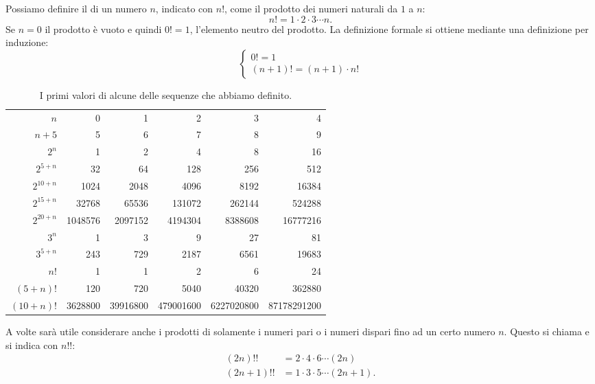 \begin{definition}[fattoriale]
Possiamo definire il  di un numero $n$, indicato con $n!$, come il prodotto
dei numeri naturali da $1$ a $n$:
\[
  n!  = 1 \cdot 2 \cdot 3 \cdots n.
\]
Se $n=0$ il prodotto è vuoto e quindi $0!=1$, l'elemento neutro del prodotto.
La definizione formale si ottiene mediante una definizione per induzione:
\[
  \begin{cases}
    0! = 1 \\
    (n+1)! = (n+1) \cdot n!
  \end{cases}
\]

\begin{table}
\begin{center}
\begin{tabular}{r|>{\small}r>{\small}r>{\small}r>{\small}r>{\small}r}
$n$       & 0 & 1 & 2 & 3 & 4 \\
\footnotesize $n+5$     & 5 & 6 & 7 & 8 & 9 \\ \hline
$2^n$     & 1 & 2 & 4 & 8 & 16 \\
\footnotesize $2^{5+n}$ & 32 & 64 & 128 & 256 & 512 \\
\footnotesize $2^{10+n}$ & 1024 & 2048 & 4096 & 8192 & 16384 \\
\footnotesize $2^{15+n}$ & 32768 & 65536 & 131072 & 262144 & 524288 \\
\footnotesize $2^{20+n}$ & 1048576 & 2097152 & 4194304 & 8388608 & 16777216 \\  \hline
$3^n$                    & 1 & 3 & 9 & 27 & 81 \\
\footnotesize $3^{5+n}$  & 243 & 729 & 2187 & 6561 & 19683 \\  \hline
$n!$      & 1 & 1 & 2 & 6 & 24 \\
\footnotesize $(5+n)!$  & 120 & 720 & 5040 & 40320 & 362880 \\
\footnotesize $(10+n)!$  & 3628800 & 39916800 & 479001600 & 6227020800 & 87178291200
\end{tabular}
\end{center}
\caption{I primi valori di alcune delle sequenze che abbiamo definito.}
\end{table}

A volte sarà utile considerare anche i prodotti di solamente i numeri
pari o i numeri dispari fino ad un certo numero $n$. Questo
si chiama  e si indica con $n!!$:
\begin{align*}
  (2n)!! &= 2 \cdot 4 \cdot 6 \cdots (2n) \\
  (2n+1)!! &= 1 \cdot 3 \cdot 5 \cdots (2n+1).
\end{align*}
\end{definition}

